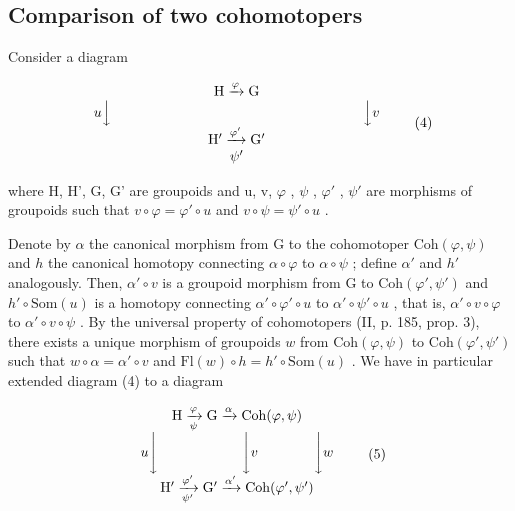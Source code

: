 \subsection{Comparison of two cohomotopers}

Consider a diagram

\[
\begin{array}{c} \mathrm{H} \xrightarrow {\varphi} \mathrm{G} \\ u \Big \downarrow \qquad \qquad \qquad \qquad \qquad \qquad \qquad \qquad \qquad \Big \downarrow v \\ \mathrm{H} ^ {\prime} \xrightarrow {\varphi^ {\prime}} \mathrm{G} ^ {\prime} \\ \psi^ {\prime} \end{array}\tag{4}
\]

where H, H', G, G' are groupoids and u, v, \(\varphi\) , \(\psi\) , \(\varphi'\) , \(\psi'\) are morphisms of groupoids such that \(v \circ \varphi = \varphi' \circ u\) and \(v \circ \psi = \psi' \circ u\) .

Denote by \(\alpha\) the canonical morphism from G to the cohomotoper \(\mathrm{Coh}(\varphi, \psi)\) and \(h\) the canonical homotopy connecting \(\alpha \circ \varphi\) to \(\alpha \circ \psi\) ; define \(\alpha'\) and \(h'\) analogously. Then, \(\alpha' \circ v\) is a groupoid morphism from G to \(\mathrm{Coh}(\varphi', \psi')\) and \(h' \circ \mathrm{Som}(u)\) is a homotopy connecting \(\alpha' \circ \varphi' \circ u\) to \(\alpha' \circ \psi' \circ u\) , that is, \(\alpha' \circ v \circ \varphi\) to \(\alpha' \circ v \circ \psi\) . By the universal property of cohomotopers (II, p. 185, prop. 3), there exists a unique morphism of groupoids \(w\) from \(\mathrm{Coh}(\varphi, \psi)\) to \(\mathrm{Coh}(\varphi', \psi')\) such that \(w \circ \alpha = \alpha' \circ v\) and \(\mathrm{Fl}(w) \circ h = h' \circ \mathrm{Som}(u)\) . We have in particular extended diagram (4) to a diagram

\[
\begin{array}{c} \mathrm{H} \xrightarrow [ \psi ]{\varphi} \mathrm{G} \xrightarrow {\alpha} \mathrm{Coh} (\varphi , \psi) \\ u \Biggl \downarrow \qquad \qquad \qquad \Biggl \downarrow v \qquad \qquad \Biggl \downarrow w \\ \mathrm{H} ^ {\prime} \xrightarrow [ \psi^ {\prime} ]{\varphi^ {\prime}} \mathrm{G} ^ {\prime} \xrightarrow {\alpha^ {\prime}} \mathrm{Coh} (\varphi^ {\prime}, \psi^ {\prime}) \end{array}\tag{5}
\]

